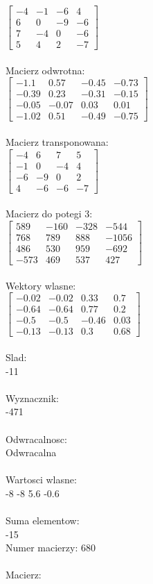 \documentclass[a4paper,12pt]{article}
\begin{document}
$\begin{bmatrix} -4&-1&-6&4\\6&0&-9&-6\\7&-4&0&-6\\5&4&2&-7 \end{bmatrix}$
\\
\\
Macierz odwrotna:\\

$\begin{bmatrix} -1.1&0.57&-0.45&-0.73\\-0.39&0.23&-0.31&-0.15\\-0.05&-0.07&0.03&0.01\\-1.02&0.51&-0.49&-0.75 \end{bmatrix}$
\\
\\
Macierz transponowana:\\

$\begin{bmatrix} -4&6&7&5\\-1&0&-4&4\\-6&-9&0&2\\4&-6&-6&-7 \end{bmatrix}$
\\
\\
Macierz do potegi 3:\\

$\begin{bmatrix} 589&-160&-328&-544\\768&789&888&-1056\\486&530&959&-692\\-573&469&537&427 \end{bmatrix}$
\\
\\
Wektory wlasne:\\

$\begin{bmatrix} -0.02&-0.02&0.33&0.7\\-0.64&-0.64&0.77&0.2\\-0.5&-0.5&-0.46&0.03\\-0.13&-0.13&0.3&0.68 \end{bmatrix}$
\\
\\
Slad:\\
-11
\\
\\
Wyznacznik:\\
-471
\\
\\
Odwracalnosc:\\
Odwracalna
\\
\\
Wartosci wlasne:\\
-8 -8 5.6 -0.6
\\
\\
Suma elementow:\\
-15
\\
\newpage
Numer macierzy:
680
\\
\\
Macierz:\\
\end{document}
